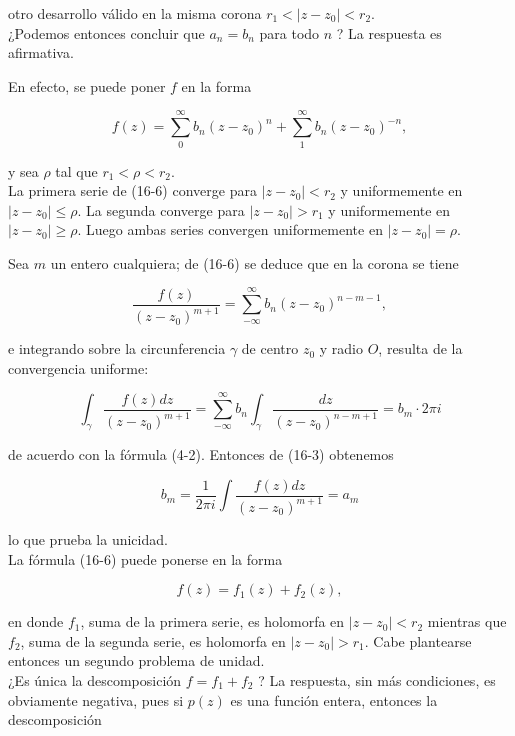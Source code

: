 \documentclass[10pt]{article}
\theoremstyle{plain}
\theoremstyle{definition}
\theoremstyle{remark}
\begin{document}
otro desarrollo válido en la misma corona $r_{1}<\left|z-z_{0}\right|<r_{2}$.\\
¿Podemos entonces concluir que $a_{n}=b_{n}$ para todo $n$ ? La respuesta es afirmativa.

En efecto, se puede poner $f$ en la forma


\begin{equation*}
f(z)=\sum_{0}^{\infty} b_{n}\left(z-z_{0}\right)^{n}+\sum_{1}^{\infty} b_{n}\left(z-z_{0}\right)^{-n}, \tag{16-6}
\end{equation*}


y sea $\rho$ tal que $r_{1}<\rho<r_{2}$.\\
La primera serie de (16-6) converge para $\left|z-z_{0}\right|<r_{2}$ y uniformemente en $\left|z-z_{0}\right| \leqslant \rho$. La segunda converge para $\left|z-z_{0}\right|>r_{1}$ y uniformemente en $\left|z-z_{0}\right| \geqslant \rho$. Luego ambas series convergen uniformemente en $\left|z-z_{0}\right|=\rho$.

Sea $m$ un entero cualquiera; de (16-6) se deduce que en la corona se tiene

$$
\frac{f(z)}{\left(z-z_{0}\right)^{m+1}}=\sum_{-\infty}^{\infty} b_{n}\left(z-z_{0}\right)^{n-m-1},
$$

e integrando sobre la circunferencia $\gamma$ de centro $z_{0}$ y radio $O$, resulta de la convergencia uniforme:

$$
\int_{\gamma} \frac{f(z) d z}{\left(z-z_{0}\right)^{m+1}}=\sum_{-\infty}^{\infty} b_{n} \int_{\gamma} \frac{d z}{\left(z-z_{0}\right)^{n-m+1}}=b_{m} \cdot 2 \pi i
$$

de acuerdo con la fórmula (4-2). Entonces de (16-3) obtenemos

$$
b_{m}=\frac{1}{2 \pi i} \int \frac{f(z) d z}{\left(z-z_{0}\right)^{m+1}}=a_{m}
$$

lo que prueba la unicidad.\\
La fórmula (16-6) puede ponerse en la forma


\begin{equation*}
f(z)=f_{1}(z)+f_{2}(z), \tag{16.7}
\end{equation*}


en donde $f_{1}$, suma de la primera serie, es holomorfa en $\left|z-z_{0}\right|<r_{2}$ mientras que $f_{2}$, suma de la segunda serie, es holomorfa en $\left|z-z_{0}\right|>r_{1}$. Cabe plantearse entonces un segundo problema de unidad.\\
¿Es única la descomposición $f=f_{1}+f_{2}$ ? La respuesta, sin más condiciones, es obviamente negativa, pues si $p(z)$ es una función entera, entonces la descomposición
\end{document}
